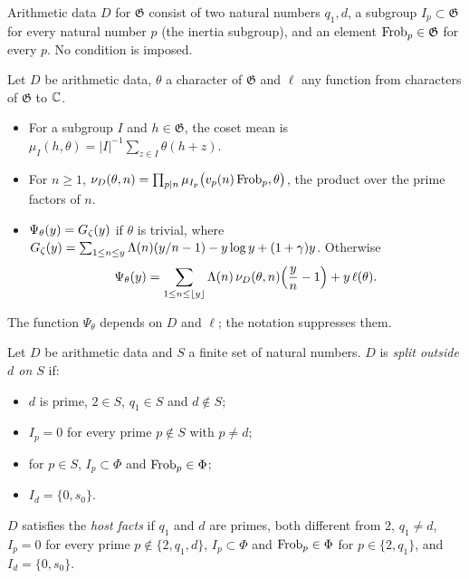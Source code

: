 \begin{definition}\label{bal:arith-data}
Arithmetic data $D$ for $\mathfrak G$ consist of two natural numbers $q_1,d$, a subgroup $I_p\subset\mathfrak G$ for every natural number $p$ (the inertia subgroup), and an element $\operatorname{Frob}_p\in\mathfrak G$ for every $p$. No condition is imposed.
\end{definition}

\begin{definition}\label{bal:gpsi}
Let $D$ be arithmetic data, $\theta$ a character of $\mathfrak G$ and $\ell$ any function from characters of $\mathfrak G$ to $\mathbb{C}$.
\begin{itemize}
\item For a subgroup $I$ and $h\in\mathfrak G$, the coset mean is $\mu_I(h,\theta)=|I|^{-1}\sum_{z\in I}\theta(h+z)$.
\item For $n\ge1$, $\nu_D(\theta,n)=\prod_{p\mid n}\mu_{I_p}\bigl(v_p(n)\operatorname{Frob}_p,\theta\bigr)$, the product over the prime factors of $n$.
\item $\Psi_{\theta}(y)=G_{\zeta}(y)$ if $\theta$ is trivial, where $G_{\zeta}(y)=\sum_{1\le n\le y}\Lambda(n)(y/n-1)-y\log y+(1+\gamma)y$. Otherwise
\[\Psi_{\theta}(y)=\sum_{1\le n\le \lfloor y\rfloor}\Lambda(n)\,\nu_D(\theta,n)\Bigl(\frac yn-1\Bigr)+y\,\ell(\theta).\]
\end{itemize}
The function $\Psi_{\theta}$ depends on $D$ and $\ell$; the notation suppresses them.
\end{definition}

\begin{definition}\label{bal:split-outside}
Let $D$ be arithmetic data and $S$ a finite set of natural numbers. $D$ is \emph{split outside $d$ on $S$} if:
\begin{itemize}
\item $d$ is prime, $2\in S$, $q_1\in S$ and $d\notin S$;
\item $I_p=0$ for every prime $p\notin S$ with $p\neq d$;
\item for $p\in S$, $I_p\subset\Phi$ and $\operatorname{Frob}_p\in\Phi$;
\item $I_d=\{0,s_0\}$.
\end{itemize}
$D$ satisfies the \emph{host facts} if $q_1$ and $d$ are primes, both different from $2$, $q_1\neq d$, $I_p=0$ for every prime $p\notin\{2,q_1,d\}$, $I_p\subset\Phi$ and $\operatorname{Frob}_p\in\Phi$ for $p\in\{2,q_1\}$, and $I_d=\{0,s_0\}$.
\end{definition}

